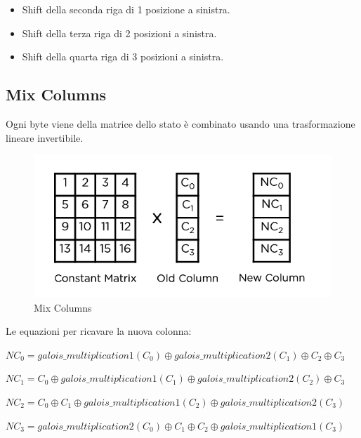 \begin{itemize}
	\item \textsf{\small Shift della seconda riga di 1 posizione a sinistra.}
	\item \textsf{\small Shift della terza riga di 2 posizioni a sinistra.}
	\item \textsf{\small Shift della quarta riga di 3 posizioni a sinistra.}
\end{itemize}

\subsection{Mix Columns}

 

\textsf{\small Ogni byte viene della matrice dello stato è combinato usando una trasformazione lineare invertibile.}

\begin{figure}[H]
	\centering
	\includegraphics[width=.9\textwidth, height=.9\textheight, keepaspectratio]{./images/aes/mixcolumns.png}
	\caption{Mix Columns}
	\label{fig:mix_columns2}
\end{figure}

\textsf{\small Le equazioni per ricavare la nuova colonna: }

\textsf{\small $ NC_0 = galois\_multiplication 1 (C_0) \oplus galois\_multiplication 2 (C_1) \oplus C_2 \oplus C_3 $}

\textsf{\small $ NC_1 = C_0 \oplus galois\_multiplication 1 (C_1) \oplus galois\_multiplication 2 (C_2) \oplus C_3 $}

\textsf{\small $ NC_2 = C_0 \oplus C_1 \oplus galois\_multiplication 1 (C_2) \oplus galois\_multiplication 2 (C_3) $ }

\textsf{\small $ NC_3 = galois\_multiplication 2 (C_0) \oplus C_1 \oplus C_2 \oplus galois\_multiplication 1 (C_3) $}

